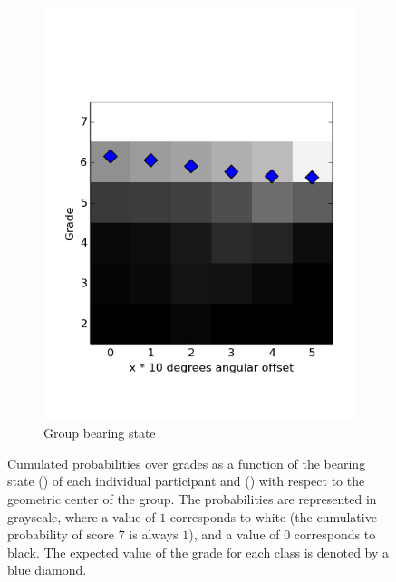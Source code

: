 \documentclass[a4paper,11pt]{report}
\begin{document}
\begin{figure}
\begin{subfigure}[b]{0.45\textwidth}
        \includegraphics[width=\textwidth]{figures/grade_cumulative_COM.png}
        \caption{Group bearing state}
        \label{fig:cumulative2}
    \end{subfigure}
    \caption{Cumulated probabilities over grades as a function of the bearing state () of each individual participant and () with respect to the geometric center of the group. The probabilities are represented in grayscale, where a value of $1$ corresponds to white (the cumulative probability of score $7$ is always $1$), and a value of $0$ corresponds to black. The expected value of the grade for each class is denoted by a blue diamond.}
    \label{fig:cumulative_probs}
\end{figure}
\end{document}
